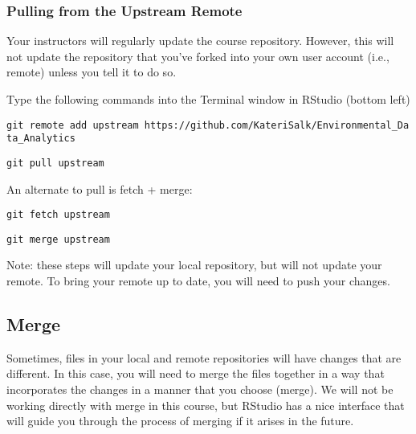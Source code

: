 \documentclass[]{article}
\begin{document}
\subsubsection{Pulling from the Upstream
Remote}\label{pulling-from-the-upstream-remote}

Your instructors will regularly update the course repository. However,
this will not update the repository that you've forked into your own
user account (i.e., remote) unless you tell it to do so.

Type the following commands into the Terminal window in RStudio (bottom
left)

\texttt{git\ remote\ add\ upstream\ https://github.com/KateriSalk/Environmental\_Data\_Analytics}

\texttt{git\ pull\ upstream}

An alternate to pull is fetch + merge:

\texttt{git\ fetch\ upstream}

\texttt{git\ merge\ upstream}

Note: these steps will update your local repository, but will not update
your remote. To bring your remote up to date, you will need to push your
changes.

\subsection{Merge}\label{merge}

Sometimes, files in your local and remote repositories will have changes
that are different. In this case, you will need to merge the files
together in a way that incorporates the changes in a manner that you
choose (merge). We will not be working directly with merge in this
course, but RStudio has a nice interface that will guide you through the
process of merging if it arises in the future.
\end{document}
